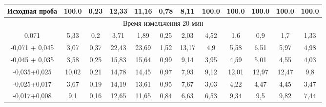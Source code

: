{\begin{longtable}[c]{|p{}ccccccccccc|}
\multicolumn{1}{|c|}{Исходная проба} & \multicolumn{1}{c|}{100.0} & \multicolumn{1}{c|}{0,23} & \multicolumn{1}{c|}{12,33} & \multicolumn{1}{c|}{11,16} & \multicolumn{1}{c|}{0,78} & \multicolumn{1}{c|}{8,11} & \multicolumn{1}{c|}{100.0} & \multicolumn{1}{c|}{100.0} & \multicolumn{1}{c|}{100.0} & \multicolumn{1}{c|}{100.0} & 100.0\\ \hline
\multicolumn{12}{|c|}{Время измельчения 20 мин} \\ \hline
\multicolumn{1}{|c|}{0,071} & \multicolumn{1}{c|}{5,33} & \multicolumn{1}{c|}{0,2} & \multicolumn{1}{c|}{3,71} & \multicolumn{1}{c|}{1,89} & \multicolumn{1}{c|}{0,25} & \multicolumn{1}{c|}{2,03} & \multicolumn{1}{c|}{4,52} & \multicolumn{1}{c|}{1,6} & \multicolumn{1}{c|}{0,9} & \multicolumn{1}{c|}{1,7} & 1,33 \\ \hline
\multicolumn{1}{|c|}{-0,071 + 0,045} & \multicolumn{1}{c|}{3,07} & \multicolumn{1}{c|}{0,37} & \multicolumn{1}{c|}{22,43} & \multicolumn{1}{c|}{23,69} & \multicolumn{1}{c|}{1,52} & \multicolumn{1}{c|}{13,17} & \multicolumn{1}{c|}{4,9} & \multicolumn{1}{c|}{5,58} & \multicolumn{1}{c|}{6,51} & \multicolumn{1}{c|}{5,97} & 4,98 \\ \hline
\multicolumn{1}{|c|}{-0,045 + 0,035} & \multicolumn{1}{c|}{3,58} & \multicolumn{1}{c|}{0,25} & \multicolumn{1}{c|}{15,83} & \multicolumn{1}{c|}{15,64} & \multicolumn{1}{c|}{0,99} & \multicolumn{1}{c|}{9,14} & \multicolumn{1}{c|}{3,95} & \multicolumn{1}{c|}{4,59} & \multicolumn{1}{c|}{5,01} & \multicolumn{1}{c|}{4,55} & 4,03 \\ \hline
\multicolumn{1}{|c|}{-0,035+0,025} & \multicolumn{1}{c|}{10,02} & \multicolumn{1}{c|}{0,21} & \multicolumn{1}{c|}{14,78} & \multicolumn{1}{c|}{14,45} & \multicolumn{1}{c|}{0,97} & \multicolumn{1}{c|}{7,93} & \multicolumn{1}{c|}{9,12} & \multicolumn{1}{c|}{12,01} & \multicolumn{1}{c|}{12,97} & \multicolumn{1}{c|}{12,47} & 9,8 \\ \hline
\multicolumn{1}{|c|}{-0,025+0,017} & \multicolumn{1}{c|}{3,67} & \multicolumn{1}{c|}{0,19} & \multicolumn{1}{c|}{14,19} & \multicolumn{1}{c|}{13,61} & \multicolumn{1}{c|}{0,95} & \multicolumn{1}{c|}{7,67} & \multicolumn{1}{c|}{3,03} & \multicolumn{1}{c|}{4,22} & \multicolumn{1}{c|}{4,47} & \multicolumn{1}{c|}{4,45} & 3,47 \\ \hline
\multicolumn{1}{|c|}{-0,017+0,008} & \multicolumn{1}{c|}{9,1} & \multicolumn{1}{c|}{0,16} & \multicolumn{1}{c|}{12,65} & \multicolumn{1}{c|}{11,65} & \multicolumn{1}{c|}{0,84} & \multicolumn{1}{c|}{6,63} & \multicolumn{1}{c|}{6,53} & \multicolumn{1}{c|}{9,34} & \multicolumn{1}{c|}{9,5} & \multicolumn{1}{c|}{9,82} & 7,44 \\ \hline

\end{longtable}}
